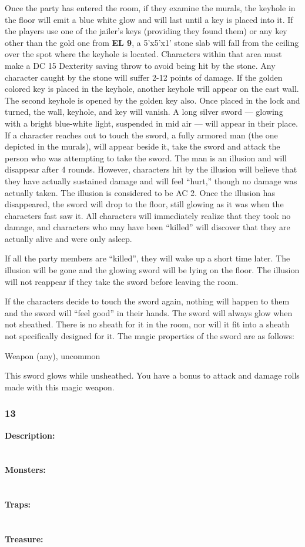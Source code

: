 \documentclass[palace_of_the_silver_princess]{subfiles}
\begin{document}
Once the party has entered the room, if they examine the murals, the
keyhole in the floor will emit a blue white glow and will last until a
key is placed into it. If the players use one of the jailer's keys
(providing they found them) or any key other than the gold one from
\textbf{EL 9}, a 5’x5’x1’ stone slab will fall from the ceiling over the
spot where the keyhole is located. Characters within that area must make
a DC 15 Dexterity saving throw to avoid being hit by the stone. Any
character caught by the stone will suffer 2-12 points of damage. If the
golden colored key is placed in the keyhole, another keyhole will appear
on the east wall. The second keyhole is opened by the golden key also.
Once placed in the lock and turned, the wall, keyhole, and key will
vanish. A long silver sword — glowing with a bright blue-white light,
suspended in mid air — will appear in their place. If a character
reaches out to touch the sword, a fully armored man (the one depicted in
the murals), will appear beside it, take the sword and attack the person
who was attempting to take the sword. The man is an illusion and will
disappear after 4 rounds. However, characters hit by the illusion will
believe that they have actually sustained damage and will feel “hurt,”
though no damage was actually taken. The illusion is considered to be AC
2. Once the illusion has disappeared, the sword will drop to the floor,
still glowing as it was when the characters fast saw it. All characters
will immediately realize that they took no damage, and characters who
may have been “killed” will discover that they are actually alive and
were only asleep.

If all the party members are “killed”, they will wake up a short time
later. The illusion will be gone and the glowing sword will be lying on
the floor. The illusion will not reappear if they take the sword before
leaving the room.

If the characters decide to touch the sword again, nothing will happen
to them and the sword will “feel good” in their hands. The sword will
always glow when not sheathed. There is no sheath for it in the room,
nor will it fit into a sheath not specifically designed for it. The
magic properties of the sword are as follows:

{Weapon (any), uncommon}

This sword glows while unsheathed.  You have a bonus to attack and damage rolls made with this magic weapon.

\subsubsection{13}
\textbf{Description:}
\\
\\
\\
\textbf{Monsters:}
\\
\\
\\
\textbf{Traps:}
\\
\\
\\
\textbf{Treasure:}
\\
\\
\\
\end{document}
